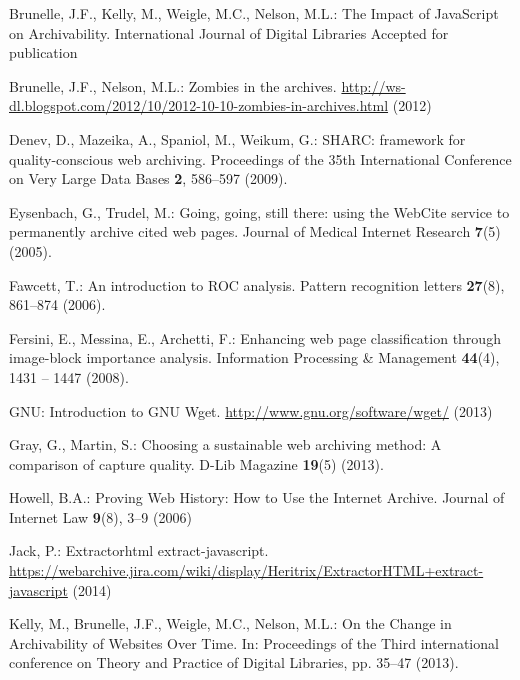 \begin{thebibliography}{10}
Brunelle, J.F., Kelly, M., Weigle, M.C., Nelson, M.L.: {The Impact of
  JavaScript on Archivability}.
\newblock International Journal of Digital Libraries Accepted for publication

Brunelle, J.F., Nelson, M.L.: Zombies in the archives.
\newblock
  \url{http://ws-dl.blogspot.com/2012/10/2012-10-10-zombies-in-archives.html}
  (2012)

Denev, D., Mazeika, A., Spaniol, M., Weikum, G.: {SHARC: framework for
  quality-conscious web archiving}.
\newblock Proceedings of the 35th International Conference on Very Large Data
  Bases \textbf{2}, 586--597 (2009).
\newblock {}

Eysenbach, G., Trudel, M.: {Going, going, still there: using the WebCite
  service to permanently archive cited web pages}.
\newblock Journal of Medical Internet Research \textbf{7}(5) (2005).
\newblock {}

Fawcett, T.: {An introduction to ROC analysis}.
\newblock Pattern recognition letters \textbf{27}(8), 861--874 (2006).
\newblock {}

Fersini, E., Messina, E., Archetti, F.: Enhancing web page classification
  through image-block importance analysis.
\newblock Information Processing \& Management \textbf{44}(4), 1431 -- 1447
  (2008).
\newblock {}

{GNU}: {Introduction to GNU Wget}.
\newblock \url{http://www.gnu.org/software/wget/} (2013)

Gray, G., Martin, S.: Choosing a sustainable web archiving method: A comparison
  of capture quality.
\newblock D-Lib Magazine \textbf{19}(5) (2013).
\newblock {}

Howell, B.A.: {Proving Web History: How to Use the Internet Archive}.
\newblock Journal of Internet Law \textbf{9}(8), 3--9 (2006)

Jack, P.: Extractorhtml extract-javascript.
\newblock
  \url{https://webarchive.jira.com/wiki/display/Heritrix/ExtractorHTML+extract-javascript}
  (2014)

Kelly, M., Brunelle, J.F., Weigle, M.C., Nelson, M.L.: {On the Change in
  Archivability of Websites Over Time}.
\newblock In: {Proceedings of the Third international conference on Theory and
  Practice of Digital Libraries}, pp. 35--47 (2013).
\newblock {}


\end{thebibliography}
